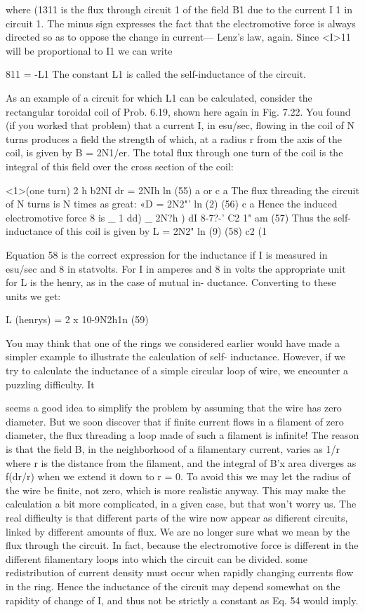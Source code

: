 where (1311 is the flux through circuit 1 of the field B1 due to the current
I 1 in circuit 1. The minus sign expresses the fact that the electromotive
force is always directed so as to oppose the change in current---
Lenz's law, again. Since <I>11 will be proportional to I1 we can write

811 = -L1 %
The constant L1 is called the self-inductance of the circuit.

As an example of a circuit for which L1 can be calculated, consider
the rectangular toroidal coil of Prob. 6.19, shown here again in
Fig. 7.22. You found (if you worked that problem) that a current I,
in esu/sec, flowing in the coil of N turns produces a field the strength
of which, at a radius r from the axis of the coil, is given by B = 2N1/er.
The total flux through one turn of the coil is the integral of this field
over the cross section of the coil:

<1>(one turn) 2 h b2NI dr = 2NIh ln  (55)
a or c a
The flux threading the circuit of N turns is N times as great:
«D = 2N2"' ln (2) (56)
c a
Hence the induced electromotive force 8 is
_ 1 dd) _ 2N?h ) dI
8-7?-' C2 1" am (57)
Thus the self-inductance of this coil is given by
L = 2N2" ln (9) (58)
c2 (1

Equation 58 is the correct expression for the inductance if I is measured
in esu/sec and 8 in statvolts. For I in amperes and 8 in volts
the appropriate unit for L is the henry, as in the case of mutual in-
ductance. Converting to these units we get:

L (henrys) = 2 x 10-9N2h1n (59)

You may think that one of the rings we considered earlier would
have made a simpler example to illustrate the calculation of self-
inductance. However, if we try to calculate the inductance of a
simple circular loop of wire, we encounter a puzzling difficulty. It

 

 

seems a good idea to simplify the problem by assuming that the wire
has zero diameter. But we soon discover that if finite current flows
in a filament of zero diameter, the flux threading a loop made of such
a filament is infinite! The reason is that the field B, in the neighborhood
of a filamentary current, varies as 1/r where r is the distance
from the filament, and the integral of B'x area diverges as f(dr/r)
when we extend it down to r = 0. To avoid this we may let the radius
of the wire be finite, not zero, which is more realistic anyway. This
may make the calculation a bit more complicated, in a given case,
but that won't worry us. The real difficulty is that different parts of
the wire now appear as difierent circuits, linked by different amounts
of flux. We are no longer sure what we mean by the flux through the
circuit. In fact, because the electromotive force is different in the
different filamentary loops into which the circuit can be divided. some
redistribution of current density must occur when rapidly changing
currents flow in the ring. Hence the inductance of the circuit may
depend somewhat on the rapidity of change of I, and thus not be
strictly a constant as Eq. 54 would imply.

